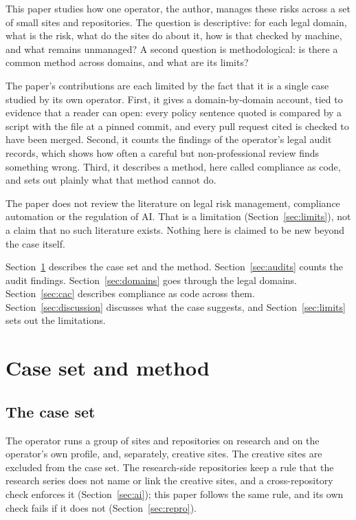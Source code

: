 \documentclass[11pt]{article}
\begin{document}
This paper studies how one operator, the author, manages these risks across a set of small sites and repositories. The question is descriptive: for each legal domain, what is the risk, what do the sites do about it, how is that checked by machine, and what remains unmanaged? A second question is methodological: is there a common method across domains, and what are its limits?

The paper's contributions are each limited by the fact that it is a single case studied by its own operator. First, it gives a domain-by-domain account, tied to evidence that a reader can open: every policy sentence quoted is compared by a script with the file at a pinned commit, and every pull request cited is checked to have been merged. Second, it counts the findings of the operator's legal audit records, which shows how often a careful but non-professional review finds something wrong. Third, it describes a method, here called compliance as code, and sets out plainly what that method cannot do.

The paper does not review the literature on legal risk management, compliance automation or the regulation of AI. That is a limitation (Section~\ref{sec:limits}), not a claim that no such literature exists. Nothing here is claimed to be new beyond the case itself.

Section~\ref{sec:method} describes the case set and the method. Section~\ref{sec:audits} counts the audit findings. Section~\ref{sec:domains} goes through the legal domains. Section~\ref{sec:cac} describes compliance as code across them. Section~\ref{sec:discussion} discusses what the case suggests, and Section~\ref{sec:limits} sets out the limitations.

\section{Case set and method}\label{sec:method}

\subsection{The case set}

The operator runs a group of sites and repositories on research and on the operator's own profile, and, separately, creative sites. The creative sites are excluded from the case set. The research-side repositories keep a rule that the research series does not name or link the creative sites, and a cross-repository check enforces it (Section~\ref{sec:ai}); this paper follows the same rule, and its own check fails if it does not (Section~\ref{sec:repro}).
\end{document}
